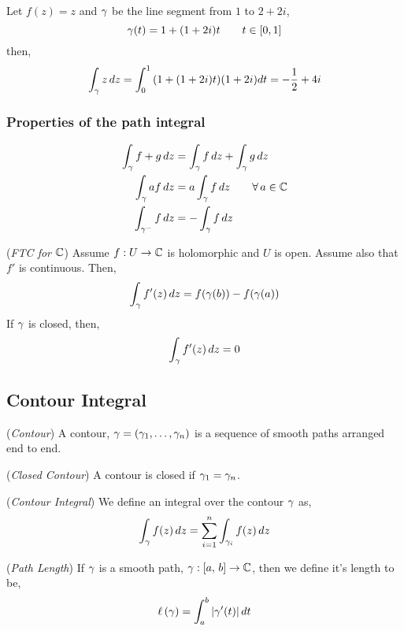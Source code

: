 \documentclass{article}
\begin{document}
\begin{eg}
  Let $f(z) = z$ and $\gamma$ be the line segment from $1$ to $2 + 2i$,
  $$ \gamma(t) = 1 + (1 + 2i)t \qquad t\in [0, 1]$$
  then,
  $$ \int_\gamma z\,dz = \int_{0}^{1} {(1 + (1 + 2i)t)}(1 + 2i)dt = -\frac{1}{2} + 4i$$
\end{eg}

\subsubsection{Properties of the path integral}

\begin{align*}
  \int_\gamma {f + g}\,dz &= \int_\gamma f\,dz + \int_\gamma g\,dz\\
  \int_\gamma af\,dz &= a\int_\gamma f\,dz \qquad {\forall\,a \in\mathbb{C}}\\
  \int_{\gamma^-} f\,dz &= -\int_\gamma f\,dz\\
\end{align*}

\begin{thm}{(\textit{FTC for $\mathbb{C}$})}
  Assume $f: U \to \mathbb{C}$ is holomorphic and $U$ is open. Assume also that $f'$ is continuous. Then,
  $$ \int_{\gamma} {f'(z)\,dz} = f(\gamma(b)) - f(\gamma(a)) $$
  If $\gamma$ is closed, then,
  $$ \int_{\gamma} {f'(z)\,dz} = 0 $$
\end{thm}

\subsection{Contour Integral}

\begin{defi}{(\textit{Contour})}
  A contour, $\gamma = (\gamma_1, \dots, \gamma_n)$ is a sequence of smooth paths arranged end to end.
\end{defi}

\begin{defi}{(\textit{Closed Contour})}
  A contour is closed if $\gamma_1 = \gamma_n$.
\end{defi}

\begin{defi}{(\textit{Contour Integral})}
  We define an integral over the contour $\gamma$ as,
  $$ \int_\gamma f(z)\,dz = \sum_{i=1}^n \int_{\gamma_i} f(z)\,dz $$
\end{defi}

\begin{defi}{(\textit{Path Length})}
  If $\gamma$ is a smooth path, $\gamma : [a,\,b] \to \mathbb{C}$, then we define it's length to be,
  $$ \ell\,(\gamma) = \int_a^b |\gamma'(t)|\,dt $$
\end{defi}
\end{document}

